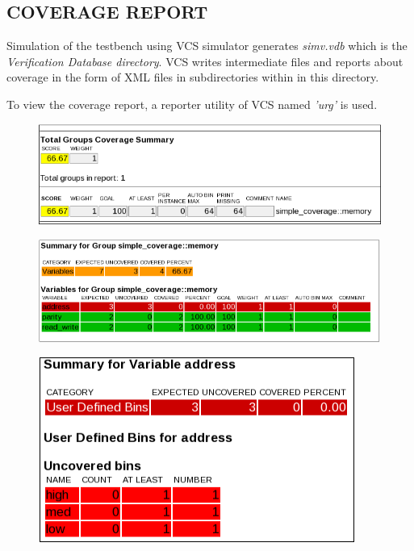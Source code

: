 \subsection{COVERAGE REPORT}
Simulation of the testbench using VCS simulator generates \emph{simv.vdb} which is the \emph{Verification Database directory}. VCS writes intermediate files and reports about coverage in the form of XML files in subdirectories within in this directory.

To view the coverage report, a reporter utility of VCS named \emph{'urg'} is used.
\vspace{15pt}
\begin{figure}[h!]
\centering
\includegraphics[scale=0.85]{./figures/urgreport2.png}
\label{fig:urgreport2.png}
\end{figure}

\begin{figure}[h!]
\centering
\includegraphics[scale=0.85]{./figures/urgreport3.png}
\label{fig:urgreport3.png}
\end{figure}

\begin{figure}[h!]
\centering
\includegraphics{./figures/urgreport4.png}
\label{fig:urgreport4.png}
\end{figure}

